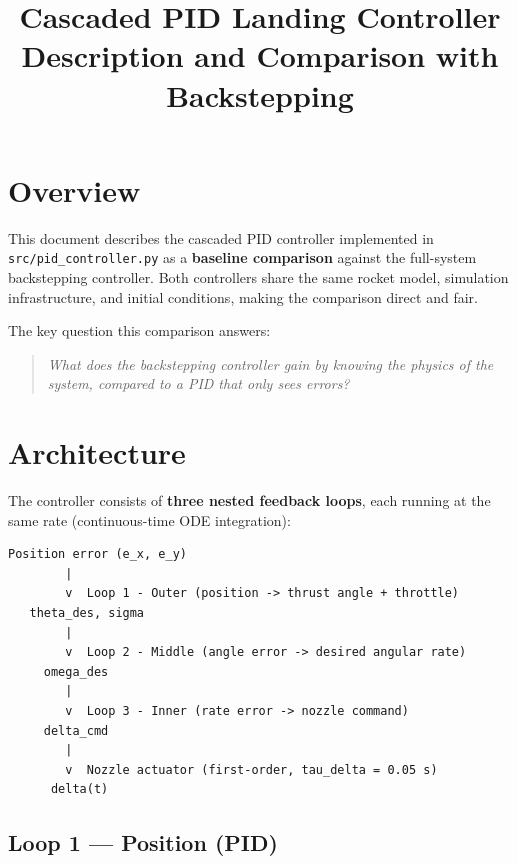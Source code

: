 \documentclass[11pt,a4paper]{article}
\title{\textbf{Cascaded PID Landing Controller}\\
\large Description and Comparison with Backstepping}
\author{}
\date{}
\begin{document}
\maketitle
\tableofcontents
\newpage

\section{Overview}

This document describes the cascaded PID controller implemented in \texttt{src/pid\_controller.py} as a \textbf{baseline comparison} against the full-system backstepping controller. Both controllers share the same rocket model, simulation infrastructure, and initial conditions, making the comparison direct and fair.

The key question this comparison answers:

\begin{quote}
\textit{What does the backstepping controller gain by knowing the physics of the system, compared to a PID that only sees errors?}
\end{quote}

\section{Architecture}

The controller consists of \textbf{three nested feedback loops}, each running at the same rate (continuous-time ODE integration):

\begin{lstlisting}
Position error (e_x, e_y)
        |
        v  Loop 1 - Outer (position -> thrust angle + throttle)
   theta_des, sigma
        |
        v  Loop 2 - Middle (angle error -> desired angular rate)
     omega_des
        |
        v  Loop 3 - Inner (rate error -> nozzle command)
     delta_cmd
        |
        v  Nozzle actuator (first-order, tau_delta = 0.05 s)
      delta(t)
\end{lstlisting}

\subsection{Loop 1 --- Position (PID)}
\end{document}
